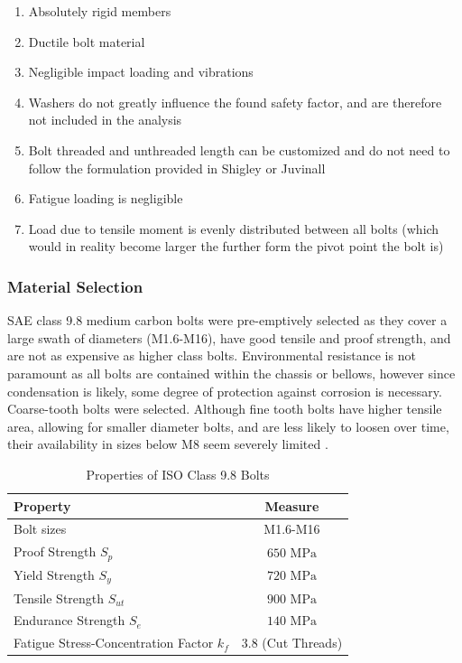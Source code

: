 \begin{enumerate}
    \item Absolutely rigid members \cite{budynas_shigleys_2015}
    \item Ductile bolt material
    \item Negligible impact loading and vibrations
    \item Washers do not greatly influence the found safety factor, and are therefore not included in the analysis
    \item Bolt threaded and unthreaded length can be customized and do not need to follow the formulation provided in Shigley or Juvinall
    \item Fatigue loading is negligible
    \item Load due to tensile moment is evenly distributed between all bolts (which would in reality become larger the further form the pivot point the bolt is)
\end{enumerate}

\subsubsection{Material Selection}

SAE class 9.8 medium carbon bolts were pre-emptively selected as they cover a large swath of diameters (M1.6-M16), have good tensile and proof strength, and are not as expensive as higher class bolts.
Environmental resistance is not paramount as all bolts are contained within the chassis or bellows, however since condensation is likely, some degree of protection against corrosion is necessary.
Coarse-tooth bolts were selected. Although fine tooth bolts have higher tensile area, allowing for smaller diameter bolts, and are less likely to loosen over time, their availability in sizes below M8 seem severely limited \cite{budynas_shigleys_2015} \cite{nord-lock_group_should_2010}.

\begin{table}[H]
    \centering
    \caption{Properties of ISO Class 9.8 Bolts}
    \label{tab:bolts_material}
    \begin{tabular}{l c}
        \\ \hline
        \textbf{Property} & \textbf{Measure}
        \\ \hline
        Bolt sizes & M1.6-M16
        \\
        Proof Strength $S_p$ & $650\text{ MPa}$
        \\
        Yield Strength $S_y$ & $720\text{ MPa}$
        \\
        Tensile Strength $S_{ut}$ & $900\text{ MPa}$
        \\
        Endurance Strength $S_e$ & $140\text{ MPa}$
        \\
        Fatigue Stress-Concentration Factor $k_f$ & $3.8$ (Cut Threads)
        \\ \hline
    \end{tabular}
\end{table}


